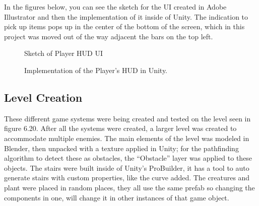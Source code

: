 \documentclass[11pt]{report}
\begin{document}
In the figures below, you can see the sketch for the UI created in Adobe Illustrator and then the implementation of it inside of Unity. The indication to pick up items pops up in the center of the bottom of the screen, which in this project was moved out of the way adjacent the bars on the top left.
\begin{figure}[H]
    \centering
    \caption{Sketch of Player HUD UI}
\end{figure}
\begin{figure}[H]
    \centering
    \caption{Implementation of the Player's HUD in Unity.}
\end{figure}


\subsection{Level Creation}

These different game systems were being created and tested on the level seen in figure 6.20. After all the systems were created, a larger level was created to accommodate multiple enemies.
The main elements of the level was modeled in Blender, then unpacked with a texture applied in Unity; for the pathfinding algorithm to detect these as obstacles, the “Obstacle” layer was applied to these objects. The stairs were built inside of Unity's ProBuilder, it has a tool to auto generate stairs with custom properties, like the curve added.
The creatures and plant were placed in random places, they all use the same prefab so changing the components in one, will change it in other instances of that game object.
\end{document}
